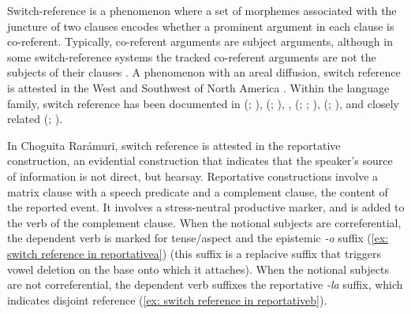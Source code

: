 Switch-reference is a phenomenon where a set of morphemes associated with the juncture of two clauses encodes whether a prominent argument in each clause is co-referent. Typically, co-referent arguments are subject arguments, although in some switch-reference systems the tracked co-referent arguments are not the subjects of their clauses \parencite{mckenzie2015survey}. A phenomenon with an areal diffusion, switch reference is attested in the West and Southwest of North America \parencite{jacobsen1967switch, jacobsen1983typological, mckenzie2015survey}. Within the  language family, switch reference has been documented in  (; \citealt{sapir1930southern}),  (; \citealt{charney1993grammar}),  \citep[]{jeanne2019argument},  (; \citealt{hale1983papago}; \citealt{hale1992subject}),  (; \citealt[]{hill2005grammar}), and closely related  (; \citealt[]{miller1996guarijio}).

In Choguita Rarámuri, switch reference is attested in the reportative construction, an evidential construction that indicates that the speaker’s source of information is not direct, but hearsay. Reportative constructions involve a matrix clause with a speech predicate and a complement clause, the content of the reported event. It involves a stress-neutral productive marker, and is added to the verb of the complement clause. When the notional subjects are correferential, the dependent verb is marked for tense/aspect and the epistemic \textit{-o} suffix (\ref{ex: switch reference in reportativea}) (this suffix is a replacive suffix that triggers vowel deletion on the base onto which it attaches). When the notional subjects are not correferential, the dependent verb suffixes the reportative \textit{-la} suffix, which indicates disjoint reference (\ref{ex: switch reference in reportativeb}).

\ea\label{ex: switch reference in reportative}

